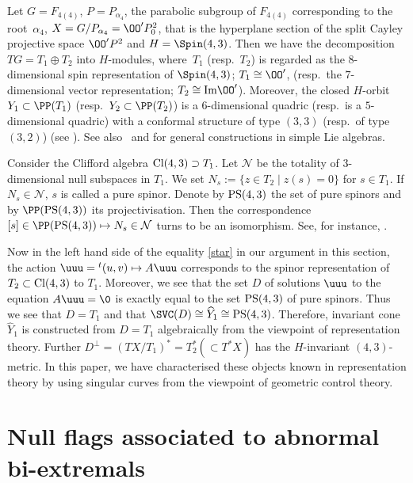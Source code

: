 \begin{Remark}
\label{Remark-representation-theory}
Let $G = F_{4(4)}$, $P = P_{\alpha_4}$, the parabolic subgroup of $F_{4(4)}$
corresponding to the root~$\alpha_4$,
$X = G/P_{\alpha_4} = \OO' P^2_0$, that is
the hyperplane section of the split Cayley projective space $\OO' P^2$ and $H = \Spin(4, 3)$.
Then we have the decomposition $TG = T_1\oplus T_2$ into $H$-modules, where~$T_1$ (resp.\ $T_2$)
is regarded as the $8$-dimensional spin representation of $\Spin(4, 3)$; $T_1 \cong \OO'$,
(resp.\ the $7$-dimensional vector representation; $T_2 \cong {\mbox{\rm {Im}}}\OO'$).
Moreover, the closed $H$-orbit $Y_1 \subset \PP(T_1)$ (resp.\ $Y_2 \subset \PP(T_2)$)
is a $6$-dimensional quadric (resp.\ is a $5$-dimensional quadric)
with a conformal structure of type $(3, 3)$ (resp.\ of type $(3, 2)$) (see \cite[Section~6.3]{LM}). See
also~\cite[Section~2]{LM} and \cite{BE, IL} for general constructions in simple Lie algebras.

Consider the Clifford algebra ${\mbox{\rm{Cl}}}(4,3) \supset T_1$.
Let ${\mathcal N}$ be the totality of $3$-dimensional null subspaces in $T_1$.
We set $N_s := \{ z \in T_2 \mid z(s) = 0\}$ for $s \in T_1$.
If $N_s \in {\mathcal N}$, $s$ is called a pure spinor. Denote by ${\rm PS}(4, 3)$
the set of pure spinors and by $\PP({\rm PS}(4, 3))$ its projectivisation. Then the correspondence $[s] \in \PP({\rm PS}(4, 3)) \mapsto N_s \in {\mathcal N}$ turns to be an isomorphism. See, for instance, \cite[p.~241 and~p.~283]{Harvey}.

Now in the left hand side of the equality \eqref{star} in our argument in this section,
the action $\uuu = {}^t(u, v) \mapsto A\uuu$
corresponds to the spinor representation of $T_2 \subset {\mbox{\rm Cl}}(4, 3)$ to $T_1$.
Moreover, we see that the set $D$ of solutions
$\uuu$ to the equation $A\uuu = \0$
is exactly equal to the set ${\rm PS}(4, 3)$ of pure spinors.
Thus we see that $D = T_1$ and that {$\SVC(D) \cong \widehat{Y}_1 \cong {\rm PS}(4,3)$}.
Therefore, invariant cone $\widehat{Y}_1$ is constructed from $D = T_1$ algebraically from the viewpoint of
representation theory. Further
$D^\perp = (TX/T_1)^* = T_2^* (\subset T^*X)$ has the $H$-invariant $(4, 3)$-metric.
In this paper, we have characterised these objects known in representation theory by using singular curves
from the viewpoint of geometric control theory.
\end{Remark}

\section{Null flags associated to abnormal bi-extremals}
\label{Null-flags}

